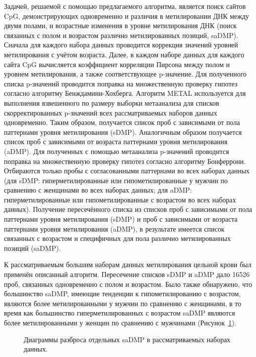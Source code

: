 Задачей, решаемой с помощью предлагаемого алгоритма, является поиск сайтов CpG, демонстрирующих одновременно и различия в метилировании ДНК между двумя полами, и возрастные изменения в уровне метилирования ДНК (поиск связанных с полом и возрастом различно метилированных позиций, saDMP). Сначала для каждого набора данных проводится коррекция значений уровней метилирования с учётом возраста. Далее, в каждом наборе данных для каждого сайта CpG вычисляется коэффициент корреляции Пирсона между полом и уровнем метилирования, а также соответствующее p-значение. Для полученного списка p-значений проводится поправка на множественную проверку гипотез согласно алгоритму Бенждамини-Хохберга. Алгоритм METAL используется для выполнения взвешенного по размеру выборки метаанализа для списков скорректированных p-значений всех рассматриваемых наборов данных одновременно. Таким образом, получается список проб с зависимыми от пола паттернами уровня метилирования (sDMP). Аналогичным образом получается список проб с зависимыми от возраста паттернами уровня метилирования (aDMP). Для полученных с помощью метаанализа p-значений проводится поправка на множественную проверку гипотез согласно алгоритму Бонферрони. Отбираются только пробы с согласованными паттернами во всех наборах данных (для sDMP: гиперметилированные или гипометилированные у мужчин по сравнению с женщинами во всех наборах данных; для aDMP: гиперметилированные или гипометилированные с возрастом во всех наборах данных). Получение пересечённого списка из списков проб с зависимыми от пола паттернами уровня метилирования (sDMP) и проб с зависимыми от возраста паттернами уровня метилирования (aDMP), в результате имеется список связанных с возрастом и специфичных для пола различно метилированных позиций (saDMP). 

К рассматриваемым большим наборам данных метилирования цельной крови был применён описанный алгоритм. Пересечение списков sDMP и aDMP дало 16526 проб, связанных одновременно с полом и возрастом. Было также обнаружено, что большинство saDMP, имеющие тенденции к гипометилированию с возрастом, являются более метилированными у мужчин по сравнению с женщинами, в то время как большинство гиперметилированных с возрастом saDMP являются более метилированными у женщин по сравнению с мужчинами (Рисунок~\ref{fig:saDMP_synopsis}).
\begin{figure}[ht]
	\caption{Диаграммы разброса отдельных saDMP в рассматриваемых наборах данных.}\label{fig:saDMP_synopsis}
\end{figure}

